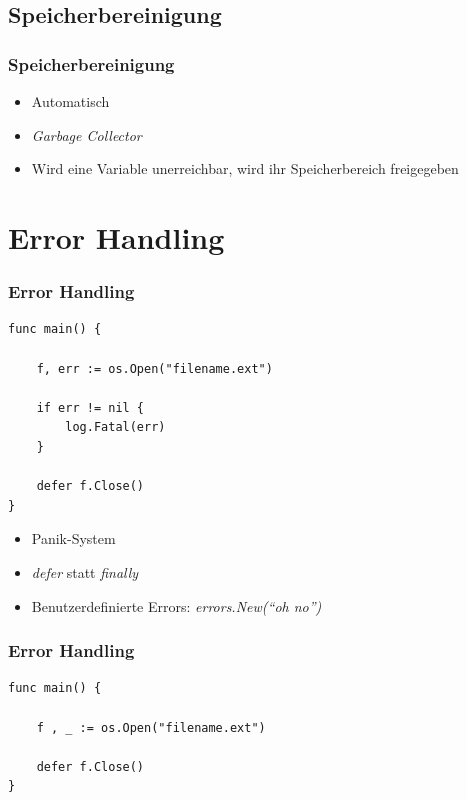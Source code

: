 \documentclass{beamer}
\begin{document}

\subsection{Speicherbereinigung}
\begin{frame}
\frametitle{Speicherbereinigung}

\begin{itemize}
\setlength{\itemsep}{30pt}
\item Automatisch
\item \textit{Garbage Collector}
\item Wird eine Variable unerreichbar, wird ihr Speicherbereich freigegeben
\end{itemize}

\end{frame}


\section{Error Handling}
\begin{frame}[fragile]
\frametitle{Error Handling}

\begin{lstlisting} 
func main() {

    f, err := os.Open("filename.ext")

    if err != nil {
        log.Fatal(err)
    }

    defer f.Close()
}
\end{lstlisting}

\begin{itemize}
\item Panik-System
\item \textit{defer} statt \textit{finally}
\item Benutzerdefinierte Errors: \textit{errors.New(``oh no'')}
\end{itemize}

\end{frame}

\begin{frame}[fragile]
\frametitle{Error Handling}

\begin{lstlisting} 
func main() {

    f , _ := os.Open("filename.ext")

    defer f.Close()
}
\end{lstlisting}

\end{frame}
\end{document}

